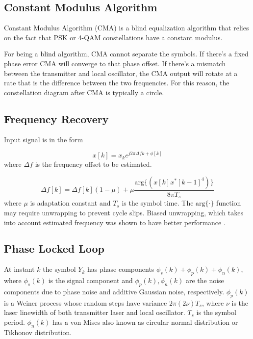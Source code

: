 \documentclass[a4paper]{article}
\begin{document}
\subsection{Constant Modulus Algorithm}

Constant Modulus Algorithm (CMA) is a blind equalization algorithm that relies on the fact that PSK or 4-QAM constellations have a constant modulus. 

For being a blind algorithm, CMA cannot separate the symbols. If there's a fixed phase error CMA will converge to that phase offset. If there's a mismatch between the transmitter and local oscillator, the CMA output will rotate at a rate that is the difference between the two frequencies. For this reason, the constellation diagram after CMA is typically a circle. 


\subsection{Frequency Recovery}
\cite{Hoffmann2008} 

Input signal is in the form

\begin{equation}
x[k] = x_ke^{j2\pi\Delta fk + \phi[k]}
\end{equation}
where $\Delta f$ is the frequency offset to be estimated.

\begin{equation}
\Delta f[k] = \Delta f[k](1-\mu) + \mu\frac{\mathrm{arg}\{(x[k]x^*[k-1]^4)\}}{8\pi T_s}
\end{equation}
where $\mu$ is adaptation constant and $T_s$ is the symbol time. The $\mathrm{arg}\{\cdot\}$ function may require unwrapping to prevent cycle slips. Biased unwrapping, which takes into account estimated frequency was shown to have better performance \cite{Hoffmann2008}.

\subsection{Phase Locked Loop}

At instant $k$ the symbol $Y_k$ has phase components $\phi_s(k) + \phi_p(k) + \phi_n(k)$, where $\phi_s(k)$ is the signal component and  $\phi_p(k), \phi_n(k)$ are the noise components due to phase noise and additive Gaussian noise, respectively. $\phi_p(k)$ is a Weiner process whose random steps have variance $2\pi(2\nu)T_s$, where $\nu$ is the laser linewidth of both transmitter laser and local oscillator. $T_s$ is the symbol period. $\phi_n(k)$ has a von Mises also known as circular normal distribution or Tikhonov distribution.
\end{document}
